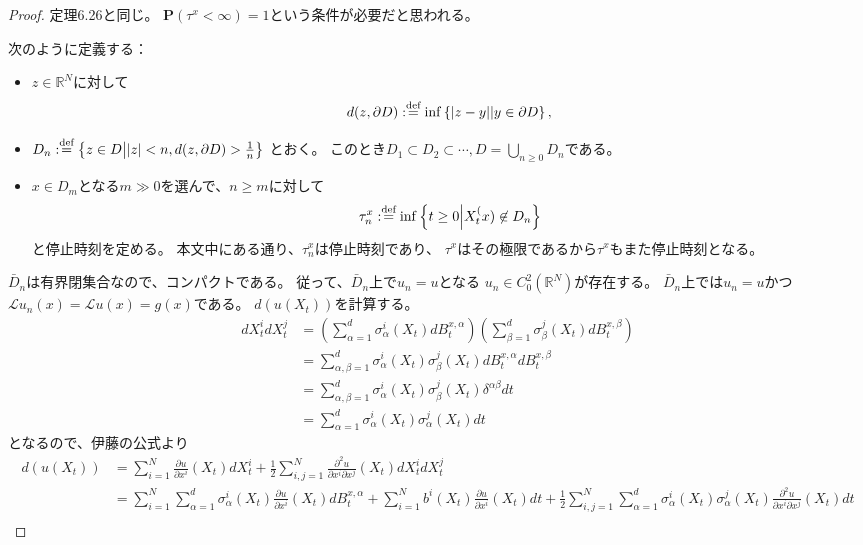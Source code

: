 \documentclass[uplatex]{jsarticle}
\theoremstyle{definition}
\def\R{\mathbb{R}}
\def\P{\mathbf{P}}
\def\mcL{\mathcal{L}}
\def\dfn{:\overset{\mbox{{\scriptsize def}}}{=}}
\begin{document}
\begin{proof}
  定理6.26と同じ。
  \(\P(\tau^x < \infty) = 1\)という条件が必要だと思われる。

  次のように定義する：
  \begin{itemize}
    \item
    \(z\in \R^N\)に対して
    \[d(z,\partial D) \dfn \inf\left\{ |z-y| \middle| y\in \partial D \right\},\]
    \item
    \(D_n \dfn \left\{ z\in D \middle| |z| < n, d(z,\partial D) > \frac{1}{n}\right\}\)
    とおく。
    このとき\(D_1\subset D_2\subset \cdots , D=\bigcup_{n\geq 0}D_n\)である。
    \item
    \(x\in D_m\)となる\(m \gg 0\)を選んで、\(n \geq m\)に対して
    \[\tau_n^x \dfn \inf\left\{ t\geq 0 \middle| X_t^(x) \not\in D_n \right\}\]
    と停止時刻を定める。
    本文中にある通り、\(\tau_n^x\)は停止時刻であり、
    \(\tau^x\)はその極限であるから\(\tau^x\)もまた停止時刻となる。
  \end{itemize}
  \(\bar{D}_n\)は有界閉集合なので、コンパクトである。
  従って、\(\bar{D}_n\)上で\(u_n = u\)となる
  \(u_n\in C^2_0(\R^N)\)が存在する。
  \(\bar{D}_n\)上では\(u_n = u\)かつ
  \(\mcL u_n(x) = \mcL u(x) = g(x) \)である。
  \(d\left( u(X_t)\right)\)を計算する。
  \begin{align*}
    dX_t^idX_t^j
    &=
    \left( \sum_{\alpha=1}^d\sigma_\alpha^i(X_t)dB_t^{x,\alpha} \right)
    \left( \sum_{\beta=1}^d\sigma_\beta^j(X_t)dB_t^{x,\beta} \right) \\
    &=
    \sum_{\alpha,\beta=1}^d
    \sigma_\alpha^i(X_t)\sigma_\beta^j(X_t)dB_t^{x,\alpha} dB_t^{x,\beta} \\
    &=
    \sum_{\alpha,\beta=1}^d
    \sigma_\alpha^i(X_t)\sigma_\beta^j(X_t)\delta^{\alpha\beta}dt \\
    &=
    \sum_{\alpha=1}^d \sigma_\alpha^i(X_t)\sigma_\alpha^j(X_t)dt
  \end{align*}
  となるので、伊藤の公式より
  \begin{align*}
    d\left( u(X_t)\right)
    &= \sum_{i=1}^N \frac{\partial u}{\partial x^i}(X_t)dX_t^i
    + \frac{1}{2}\sum_{i,j=1}^N
    \frac{\partial^2 u}{\partial x^i\partial x^j}(X_t)dX_t^idX_t^j \\
    &= \sum_{i=1}^N \sum_{\alpha=1}^d
    \sigma_\alpha^i(X_t)\frac{\partial u}{\partial x^i}(X_t)dB_t^{x,\alpha}
    + \sum_{i=1}^N b^i(X_t)\frac{\partial u}{\partial x^i}(X_t)dt
    + \frac{1}{2}\sum_{i,j=1}^N \sum_{\alpha=1}^d
    \sigma_\alpha^i(X_t)\sigma_\alpha^j(X_t)
    \frac{\partial^2 u}{\partial x^i\partial x^j}(X_t) dt \\

\end{align*}
\end{proof}
\end{document}
